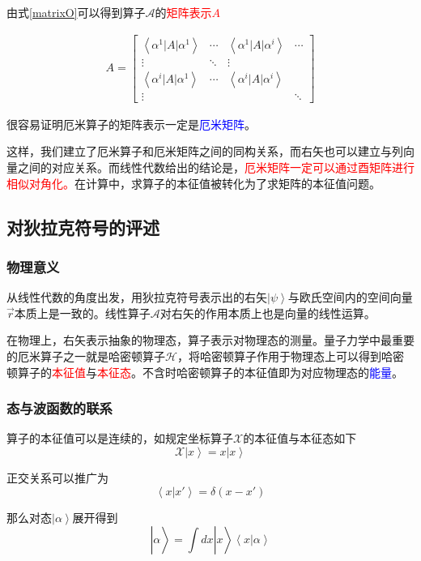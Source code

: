 \documentclass[UTF8,12pt]{article}
\providecommand\Ket[1]{\left|\right. #1 \left.\right\rangle}
\providecommand\Bracket[2]{\left\langle #1 \big| #2 \right\rangle}
\providecommand\BraCket[3]{\left\langle #1 \big| #2 \big| #3 \right\rangle}
\numberwithin{equation}{subsection}
\providecommand{\empB}[1]{\textcolor{blue}{#1}}
\providecommand{\empR}[1]{\textcolor{red}{#1}}
\begin{document}
	由式\ref{matrixO}可以得到算子$\mathcal A$的\empR{矩阵表示$A$}\begin{snugshade}
		\begin{equation}
			\begin{aligned}
				A = \begin{bmatrix}
					\BraCket{\alpha^1}{A}{\alpha^1}&\cdots&\BraCket{\alpha^1}{A}{\alpha^i}&\cdots\\
					\vdots&\ddots&\vdots&\\
					\BraCket{\alpha^i}{A}{\alpha^1}&\cdots&\BraCket{\alpha^i}{A}{\alpha^i}\\
					\vdots&&&\ddots
				\end{bmatrix}
			\end{aligned}
			\label{matrix}
		\end{equation}
	\end{snugshade}

	很容易证明厄米算子的矩阵表示一定是\empB{厄米矩阵}。

	这样，我们建立了厄米算子和厄米矩阵之间的同构关系，而右矢也可以建立与列向量之间的对应关系。而线性代数给出的结论是，\empR{厄米矩阵一定可以通过酉矩阵进行相似对角化。}在计算中，求算子的本征值被转化为了求矩阵的本征值问题。
	\subsection{对狄拉克符号的评述}
	\subsubsection{物理意义}
	从线性代数的角度出发，用狄拉克符号表示出的右矢$\Ket{\psi}$与欧氏空间内的空间向量$\vec r$本质上是一致的。线性算子$\mathcal A$对右矢的作用本质上也是向量的线性运算。
	
	在物理上，右矢表示抽象的物理态，算子表示对物理态的测量。量子力学中最重要的厄米算子之一就是哈密顿算子$\mathcal H$，将哈密顿算子作用于物理态上可以得到哈密顿算子的\empR{本征值}与\empR{本征态}。不含时哈密顿算子的本征值即为对应物理态的\empB{能量}。
	\subsubsection{态与波函数的联系}
	算子的本征值可以是连续的，如规定坐标算子$\mathcal X$的本征值与本征态如下$$\mathcal X\Ket{x} = x\Ket{x}$$
	
	正交关系可以推广为$$\Bracket{x}{x'}=\delta(x-x')$$
	
	那么对态$\Ket{\alpha}$展开得到$$\Ket{\alpha} = \int dx\Ket{x}\Bracket{x}{\alpha}$$
	
\end{document}
